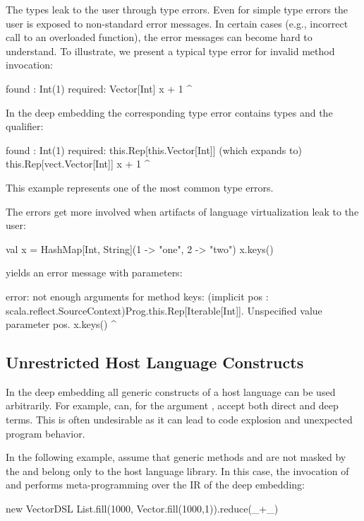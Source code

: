 The  types leak to the user through type errors. Even for simple type errors the user is exposed to non-standard error messages. In certain cases (e.g., incorrect call to an overloaded function), the error messages can become hard to understand. To illustrate, we present a typical type error for invalid method invocation:
\begin{lstparagraph}
  found   : Int(1)
  required: Vector[Int]
       x + 1
           ^
\end{lstparagraph}
In the deep embedding the corresponding type error contains  types and the  qualifier:
\begin{lstparagraph}
  found   : Int(1)
  required: this.Rep[this.Vector[Int]]
       (which expands to) this.Rep[vect.Vector[Int]]
       x + 1
           ^
\end{lstparagraph}
This example represents one of the  most common type errors.

The errors get more involved when artifacts of language virtualization leak to the user:\begin{lstparagraph}
val x = HashMap[Int, String](1 -> "one", 2 -> "two")
x.keys()
\end{lstparagraph} yields an error message with  parameters:\begin{lstparagraph}
error: not enough arguments for method keys: (implicit pos
: scala.reflect.SourceContext)Prog.this.Rep[Iterable[Int]].
Unspecified value parameter pos.
  x.keys()
        ^
\end{lstparagraph}

\subsection{Unrestricted Host Language Constructs}
\label{sec:unrestricted-language}

In the deep embedding all generic constructs of a host language can be
 used arbitrarily. For example, 
 can, for the argument , accept both direct and deep terms.
 This is often undesirable as it can lead to code explosion and unexpected program behavior.

In the following example, assume that generic methods  and
   are not masked by the  and belong only to the host
  language library. In this case, the invocation of  and 
  performs meta-programming over the IR of the deep embedding:\begin{lstparagraph}
new VectorDSL {
  List.fill(1000, Vector.fill(1000,1)).reduce(_+_)
}
\end{lstparagraph}

